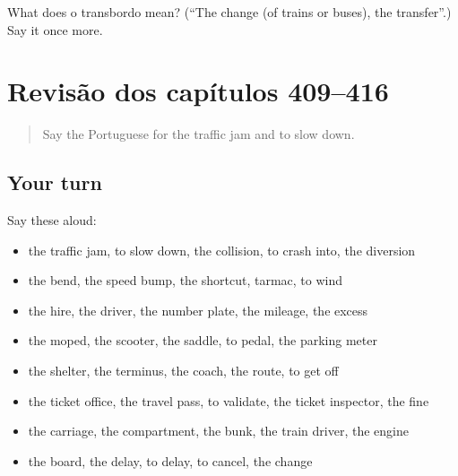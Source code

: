 \begin{tcolorbox}[breakable,colback=teal!4,colframe=teal!35!black,title={Before you move on}]
What does o transbordo mean? (\textquotedblleft{}The change (of trains or buses), the transfer\textquotedblright{}.) Say it once more.
\end{tcolorbox}
\section[(dialogue)]{Revisão dos capítulos 409–416}

\label{lesson:PT-R416-revisao-409-416}



\begin{quote}
Say the Portuguese for the traffic jam and to slow down.
\end{quote}

\subsection*{Your turn}
Say these aloud:

\begin{itemize}
\raggedright
  \item the traffic jam, to slow down, the collision, to crash into, the diversion
  \item the bend, the speed bump, the shortcut, tarmac, to wind
  \item the hire, the driver, the number plate, the mileage, the excess
  \item the moped, the scooter, the saddle, to pedal, the parking meter
  \item the shelter, the terminus, the coach, the route, to get off
  \item the ticket office, the travel pass, to validate, the ticket inspector, the fine
  \item the carriage, the compartment, the bunk, the train driver, the engine
  \item the board, the delay, to delay, to cancel, the change
\end{itemize}

